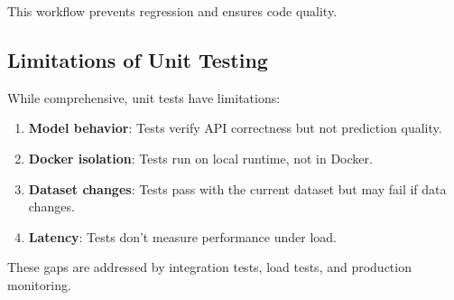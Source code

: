 This workflow prevents regression and ensures code quality.

\subsection{Limitations of Unit Testing}

While comprehensive, unit tests have limitations:

\begin{enumerate}
  \item \textbf{Model behavior}: Tests verify API correctness but not prediction quality.
  
  \item \textbf{Docker isolation}: Tests run on local runtime, not in Docker.
  
  \item \textbf{Dataset changes}: Tests pass with the current dataset but may fail if data changes.
  
  \item \textbf{Latency}: Tests don't measure performance under load.
\end{enumerate}

These gaps are addressed by integration tests, load tests, and production monitoring.
